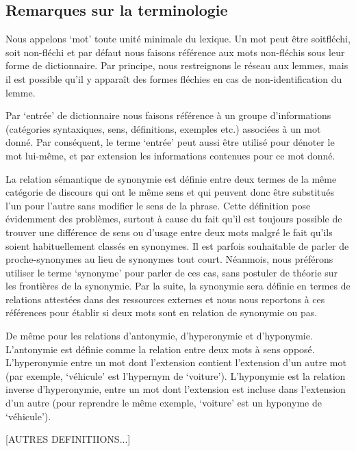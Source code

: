 \subsection{Remarques sur la terminologie}
Nous appelons `mot' toute unité minimale du lexique. Un mot peut être
soitfléchi, soit non-fléchi et par défaut nous faisons référence aux mots 
non-fléchis sous leur forme de dictionnaire. Par principe, nous restreignons le 
réseau aux lemmes, mais il est possible qu'il y apparaît des formes fléchies en 
cas de non-identification du lemme.

Par `entrée' de dictionnaire nous faisons référence à un groupe d'informations 
(catégories syntaxiques, sens, définitions, exemples etc.) associées à un mot 
donné. Par conséquent, le terme `entrée' peut aussi être utilisé pour dénoter 
le mot lui-même, et par extension les informations contenues pour ce mot donné.

La relation sémantique de synonymie est définie entre deux termes de la même 
catégorie de discours qui ont le même sens et qui peuvent donc être substitués 
l'un pour l'autre sans modifier le sens de la phrase. Cette définition pose 
évidemment des problèmes, surtout à cause du fait qu'il est toujours possible 
de trouver une différence de sens ou d'usage entre deux mots malgré le fait 
qu'ils soient habituellement classés en synonymes. Il est parfois souhaitable 
de parler de proche-synonymes au lieu de synonymes tout court. Néanmois, 
nous préférons utiliser le terme `synonyme' pour parler de ces cas, sans 
postuler de théorie sur les frontières de la synonymie. Par la suite, la 
synonymie sera définie en termes de relations attestées dans des ressources 
externes et nous nous reportons à ces références pour établir si deux mots sont 
en relation de synonymie ou pas.

De même pour les relations d'antonymie, d'hyperonymie et d'hyponymie. 
L'antonymie est définie comme la relation entre deux mots à sens opposé. 
L'hyperonymie entre un mot dont l'extension contient l'extension d'un autre mot 
(par exemple, `véhicule' est l'hypernym de `voiture'). L'hyponymie est la 
relation inverse d'hyperonymie, entre un mot dont l'extension est incluse dans 
l'extension d'un autre (pour reprendre le même exemple, `voiture' est un 
hyponyme de `véhicule').

[AUTRES DEFINITIIONS...]

